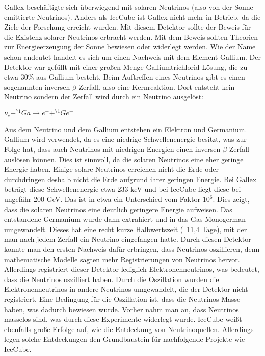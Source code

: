     Gallex beschäftigte sich überwiegend mit solaren Neutrinos (also von der Sonne emittierte Neutrinos). Anders als IceCube ist Gallex nicht mehr in Betrieb, 
    da die Ziele der Forschung erreicht wurden. Mit diesem Detektor sollte der Beweis für die Existenz solarer Neutrinos erbracht werden. 
    Mit dem Beweis sollten Theorien zur Energieerzeugung der Sonne bewiesen oder widerlegt werden. Wie der Name schon andeutet handelt 
    es sich um einen Nachweis mit dem Element Gallium. Der Detektor war gefüllt mit einer großen Menge Galliumtrichlorid-Lösung, 
    die zu etwa 30\% aus Gallium besteht. Beim Auftreffen eines Neutrinos gibt es einen sogenannten inversen $\beta$-Zerfall, also eine
    Kernreaktion. Dort entsteht kein Neutrino sondern der Zerfall wird durch ein Neutrino ausgelöst:
    \begin{center}
        $\nu_e+^{71}Ga\rightarrow e^- + ^{71}Ge^+$
    \end{center}
    Aus dem Neutrino und dem Gallium entstehen ein Elektron und Germanium. Gallium wird verwendet, 
    da es eine niedrige Schwellenenergie besitzt, was zur Folge hat, dass auch Neutrinos mit niedrigen 
    Energien einen inversen $\beta$-Zerfall auslösen können. Dies ist sinnvoll, da die solaren Neutrinos eine 
    eher geringe Energie haben. Einige solare Neutrinos erreichen nicht die Erde oder durchdringen deshalb 
    nicht die Erde aufgrund ihrer geringen Energie. Bei Gallex beträgt diese Schwellenenergie etwa 233 keV 
    und bei IceCube liegt diese bei ungefähr 200 GeV. Das ist in etwa ein Unterschied vom Faktor $10^6$. Dies 
    zeigt, dass die solaren Neutrinos eine deutlich geringere Energie aufweisen. Das entstandene Germanium 
    wurde dann extrahiert und in das Gas Monogerman umgewandelt. Dieses hat eine recht kurze Halbwertszeit 
    (~11,4 Tage), mit der man nach jedem Zerfall ein Neutrino \grqq eingefangen\grqq{} hatte. Durch diesen Detektor konnte 
    man den ersten Nachweis dafür erbringen, dass Neutrinos oszillieren, denn mathematische Modelle sagten 
    mehr Registrierungen von Neutrinos hervor. Allerdings registriert dieser Detektor lediglich 
    Elektronenneutrinos, was bedeutet, dass die Neutrinos oszilliert haben. Durch die Oszillation wurden die 
    Elektronenneutrinos in andere Neutrinos umgewandelt, die der Detektor nicht registriert. Eine Bedingung 
    für die Oszillation ist, dass die Neutrinos Masse haben, was dadurch bewiesen wurde. Vorher nahm man an, 
    dass Neutrinos masselos sind, was durch diese Experimente widerlegt wurde. IceCube weißt ebenfalls große 
    Erfolge auf, wie die Entdeckung von Neutrinoquellen. Allerdings legen solche Entdeckungen den Grundbaustein 
    für nachfolgende Projekte wie IceCube. \cite{PhyGA13}

